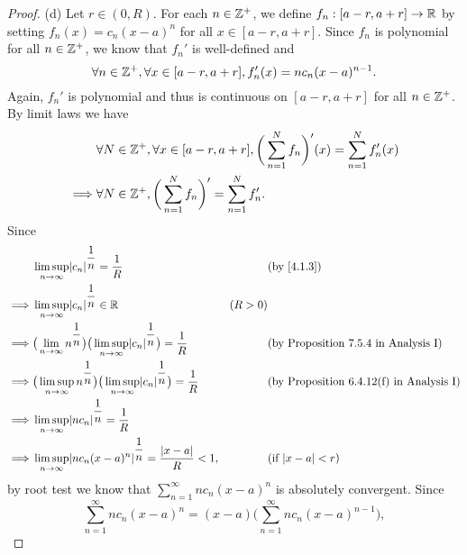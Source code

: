 \begin{proof}{(d)}
  Let \(r \in (0, R)\).
  For each \(n \in \mathbb{Z}^+\), we define \(f_n : [a - r, a + r] \to \mathbb{R}\) by setting \(f_n(x) = c_n (x - a)^n\) for all \(x \in [a - r, a + r]\).
  Since \(f_n\) is polynomial for all \(n \in \mathbb{Z}^+\), we know that \(f_n'\) is well-defined and
  \[
    \forall n \in \mathbb{Z}^+, \forall x \in [a - r, a + r], f_n'(x) = n c_n (x - a)^{n - 1}.
  \]
  Again, \(f_n'\) is polynomial and thus is continuous on \([a - r, a + r]\) for all \(n \in \mathbb{Z}^+\).
  By limit laws we have
  \begin{align*}
             & \forall N \in \mathbb{Z}^+, \forall x \in [a - r, a + r], \bigg(\sum_{n = 1}^N f_n\bigg)'(x) = \sum_{n = 1}^N f_n'(x) \\
    \implies & \forall N \in \mathbb{Z}^+, \bigg(\sum_{n = 1}^N f_n\bigg)' = \sum_{n = 1}^N f_n'.
  \end{align*}
  Since
  \begin{align*}
             & \limsup_{n \to \infty} \abs{c_n}^{\dfrac{1}{n}} = \dfrac{1}{R}                                                             &         & \text{(by \cref{4.1.3})}                        \\
    \implies & \limsup_{n \to \infty} \abs{c_n}^{\dfrac{1}{n}} \in \R                                                                     & (R > 0)                                                   \\
    \implies & \big(\lim_{n \to \infty} n^{\dfrac{1}{n}}\big) \big(\limsup_{n \to \infty} \abs{c_n}^{\dfrac{1}{n}}\big) = \dfrac{1}{R}    &         & \text{(by Proposition 7.5.4 in Analysis I)}     \\
    \implies & \big(\limsup_{n \to \infty} n^{\dfrac{1}{n}}\big) \big(\limsup_{n \to \infty} \abs{c_n}^{\dfrac{1}{n}}\big) = \dfrac{1}{R} &         & \text{(by Proposition 6.4.12(f) in Analysis I)} \\
    \implies & \limsup_{n \to \infty} \abs{n c_n}^{\dfrac{1}{n}} = \dfrac{1}{R}                                                                                                                       \\
    \implies & \limsup_{n \to \infty} \abs{n c_n (x - a)^n}^{\dfrac{1}{n}} = \dfrac{\abs{x - a}}{R} < 1,                                  &         & \text{(if \(\abs{x - a} < r\))}
  \end{align*}
  by root test we know that \(\sum_{n = 1}^\infty n c_n (x - a)^n\) is absolutely convergent.
  Since
  \[
    \sum_{n = 1}^\infty n c_n (x - a)^n = (x - a) \bigg(\sum_{n = 1}^\infty n c_n (x - a)^{n - 1}\bigg),
\]
\end{proof}
